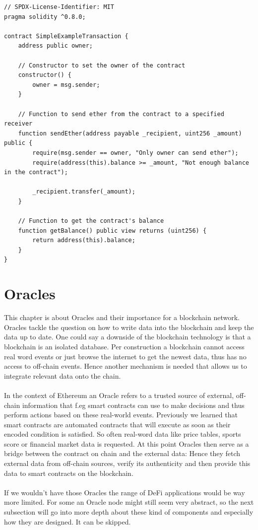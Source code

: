 \documentclass{article}
\begin{document}
\begin{verbatim}
// SPDX-License-Identifier: MIT
pragma solidity ^0.8.0;

contract SimpleExampleTransaction {
    address public owner;

    // Constructor to set the owner of the contract
    constructor() {
        owner = msg.sender;
    }

    // Function to send ether from the contract to a specified receiver 
    function sendEther(address payable _recipient, uint256 _amount) public {
        require(msg.sender == owner, "Only owner can send ether");
        require(address(this).balance >= _amount, "Not enough balance in the contract");

        _recipient.transfer(_amount);
    }

    // Function to get the contract's balance
    function getBalance() public view returns (uint256) {
        return address(this).balance;
    }
}

\end{verbatim}
\section{Oracles}
This chapter is about Oracles and their importance for a blockchain network. Oracles tackle the question on how to write data into the blockchain and keep the data up to date. One could say a downside of the blockchain technology is that a blockchain is an isolated database. Per construction a blockchain cannot access real word events or just browse the internet to get the newest data, thus has no access to off-chain events. Hence another mechanism is needed that allows us to integrate relevant data onto the chain.\\\\
In the context of Ethereum an Oracle refers to a trusted source of external, off-chain information that f.eg smart contracts can use to make decisions and thus perform actions based on these real-world events. Previously we learned that smart contracts are automated contracts that will execute as soon as their encoded condition is satisfied. So often real-word data like price tables, sports score or financial market data is requested. At this point Oracles then serve as a bridge between the contract on chain and the external data: Hence they fetch external data from off-chain sources, verify its authenticity and then provide this data to smart contracts on the blockchain.\\\\If we wouldn't have those Oracles the range of DeFi applications would be way more limited. 
For some an Oracle node might still seem very abstract, so the next subsection will go into more depth about these kind of components and especially how they are designed. It can be skipped.
\end{document}
